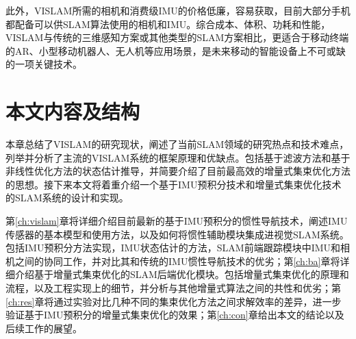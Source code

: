 此外，VISLAM所需的相机和消费级IMU的价格低廉，容易获取，目前大部分手机都配备可以供SLAM算法使用的相机和IMU。综合成本、体积、功耗和性能，VISLAM与传统的三维感知方案或其他类型的SLAM方案相比，更适合于移动终端的AR、小型移动机器人、无人机等应用场景，是未来移动的智能设备上不可或缺的一项关键技术。




\section{本文内容及结构}

本章总结了VISLAM的研究现状，阐述了当前SLAM领域的研究热点和技术难点，列举并分析了主流的VISLAM系统的框架原理和优缺点。包括基于滤波方法和基于非线性优化方法的状态估计推导，并简要介绍了目前最高效的增量式集束优化方法的思想。接下来本文将着重介绍一个基于IMU预积分技术和增量式集束优化技术的SLAM系统的设计和实现。

第\ref{ch:vislam}章将详细介绍目前最新的基于IMU预积分的惯性导航技术，阐述IMU传感器的基本模型和使用方法，以及如何将惯性辅助模块集成进视觉SLAM系统。包括IMU预积分方法实现，IMU状态估计的方法，SLAM前端跟踪模块中IMU和相机之间的协同工作，并对比其和传统的IMU惯性导航技术的优劣；第\ref{ch:ba}章将详细介绍基于增量式集束优化的SLAM后端优化模块。包括增量式集束优化的原理和流程，以及工程实现上的细节，并分析与其他增量式算法之间的共性和优劣；第\ref{ch:res}章将通过实验对比几种不同的集束优化方法之间求解效率的差异，进一步验证基于IMU预积分的增量式集束优化的效果；第\ref{ch:con}章给出本文的结论以及后续工作的展望。
